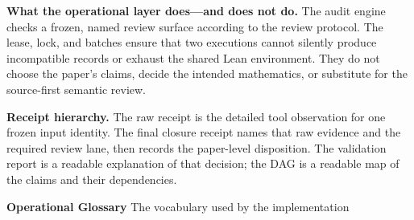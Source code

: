 \documentclass[10pt]{article}
\newcommand{\Lean}{Lean}
\begin{document}
\textbf{What the operational layer does—and does not do.}
The audit engine
checks a frozen, named review surface according to the review protocol. The
lease, lock, and batches ensure that two executions cannot silently produce
incompatible records or exhaust the shared \Lean{} environment. They do not
choose the paper's claims, decide the intended mathematics, or substitute for
the source-first semantic review.

\textbf{Receipt hierarchy.}
The raw receipt is the detailed tool observation
for one frozen input identity. The final closure receipt names that raw evidence
and the required review lane, then records the paper-level disposition. The
validation report is a readable explanation of that decision; the DAG is a
readable map of the claims and their dependencies.

\newpage

{\sffamily\bfseries\Large Operational Glossary}\hfill
{\sffamily\small The vocabulary used by the implementation}
\end{document}
